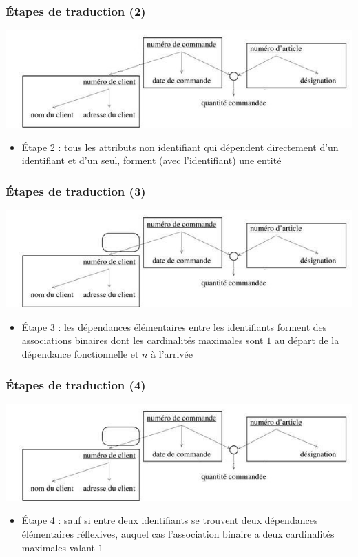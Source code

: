 \begin{frame}
  \frametitle{Étapes de traduction (2)}
  \begin{center}
    \includegraphics[width=0.9\linewidth]{graphe_identifie_2.jpg}
  \end{center}
  \begin{itemize}
    \item Étape 2 : tous les attributs non identifiant qui dépendent directement d'un identifiant et d'un
      seul, forment (avec l'identifiant) une entité
  \end{itemize}
\end{frame}

\begin{frame}
  \frametitle{Étapes de traduction (3)}
  \begin{center}
    \includegraphics[width=0.9\linewidth]{graphe_identifie_3.jpg}
  \end{center}
  \begin{itemize}
    \item Étape 3 : les dépendances élémentaires entre les identifiants forment des associations
      binaires dont les cardinalités maximales sont $1$ au départ de la dépendance fonctionnelle et $n$ à
      l'arrivée
  \end{itemize}
\end{frame}

\begin{frame}
  \frametitle{Étapes de traduction (4)}
  \begin{center}
    \includegraphics[width=0.9\linewidth]{graphe_identifie_3.jpg}
  \end{center}
  \begin{itemize}
    \item Étape 4 : sauf si entre deux identifiants se trouvent deux dépendances élémentaires réflexives,
      auquel cas l'association binaire a deux cardinalités maximales valant $1$
  \end{itemize}
\end{frame}


